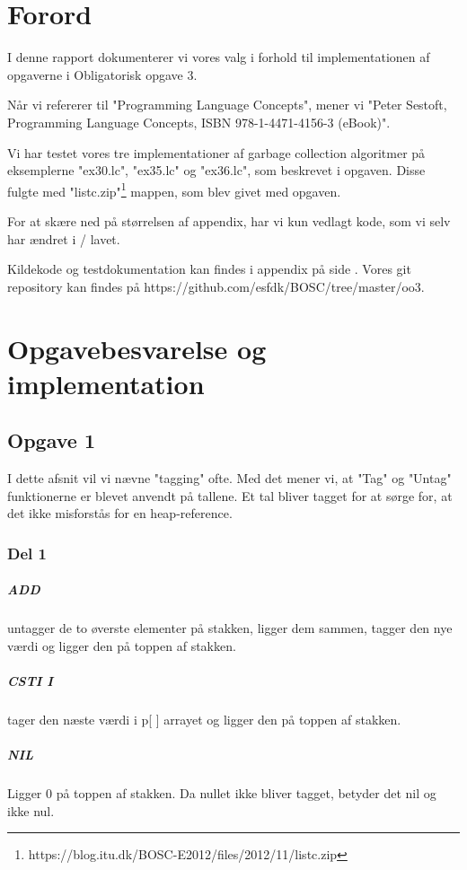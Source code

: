 \chapter{Forord}
I denne rapport dokumenterer vi vores valg i forhold til implementationen af opgaverne i Obligatorisk opgave 3.

Når vi refererer til "Programming Language Concepts", mener vi "Peter Sestoft, Programming Language Concepts, ISBN 978-1-4471-4156-3 (eBook)".

Vi har testet vores tre implementationer af garbage collection algoritmer på eksemplerne "ex30.lc", "ex35.lc" og "ex36.lc", som beskrevet i opgaven. Disse fulgte med "listc.zip"\footnote{https://blog.itu.dk/BOSC-E2012/files/2012/11/listc.zip} mappen, som blev givet med opgaven. 

For at skære ned på størrelsen af appendix, har vi kun vedlagt kode, som vi selv har ændret i / lavet.

Kildekode og testdokumentation kan findes i appendix på side \pageref{Appendix}. Vores git repository kan findes på https://github.com/esfdk/BOSC/tree/master/oo3.

\chapter{Opgavebesvarelse og implementation}
\section{Opgave 1}
\label{O1}
I dette afsnit vil vi nævne "tagging" ofte. Med det mener vi, at "Tag" og "Untag" funktionerne er blevet anvendt på tallene. Et tal bliver tagget for at sørge for, at det ikke misforstås for en heap-reference.
\subsection{Del 1}
\label{O1_1}
\paragraph{ADD} untagger de to øverste elementer på stakken, ligger dem sammen, tagger den nye værdi og ligger den på toppen af stakken.
\paragraph{CSTI I} tager den næste værdi i p[ ] arrayet og ligger den på toppen af stakken.
\paragraph{NIL} Ligger 0 på toppen af stakken. Da nullet ikke bliver tagget, betyder det nil og ikke nul.
